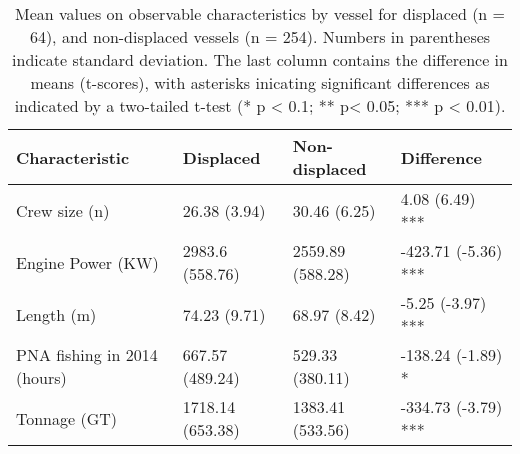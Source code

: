 \begin{table}[t]

\caption{\label{tab:}Mean values on observable characteristics by vessel for displaced (n = 64), and non-displaced vessels (n = 254). Numbers in parentheses indicate standard deviation. The last column contains the difference in means (t-scores), with asterisks inicating significant differences as indicated by a two-tailed t-test (* p < 0.1; ** p< 0.05; *** p < 0.01).}
\centering
\begin{tabular}{l|l|l|l}
\hline
Characteristic & Displaced & Non-displaced & Difference\\
\hline
Crew size (n) & 26.38 (3.94) & 30.46 (6.25) & 4.08 (6.49) ***\\
\hline
Engine Power (KW) & 2983.6 (558.76) & 2559.89 (588.28) & -423.71 (-5.36) ***\\
\hline
Length (m) & 74.23 (9.71) & 68.97 (8.42) & -5.25 (-3.97) ***\\
\hline
PNA fishing in 2014 (hours) & 667.57 (489.24) & 529.33 (380.11) & -138.24 (-1.89) *\\
\hline
Tonnage (GT) & 1718.14 (653.38) & 1383.41 (533.56) & -334.73 (-3.79) ***\\
\hline
\end{tabular}
\end{table}